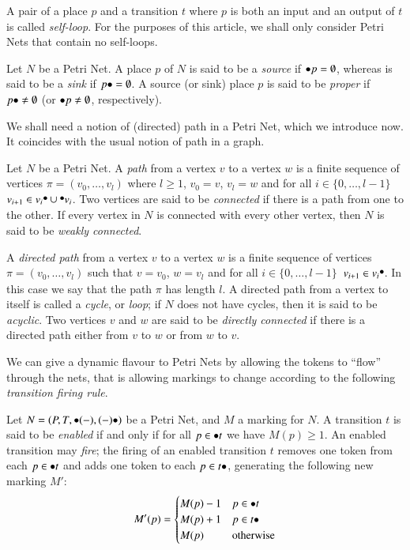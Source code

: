 A pair of a place $p$ and a transition $t$ where $p$ is both an input and an output of $t$ is called \emph{self-loop}. For the purposes of this article, we shall only consider Petri Nets that contain no self-loops.


\begin{definition}
	Let $N$ be a Petri Net. A place $p$ of $N$ is said to be a \emph{source} if $\inp p = \emptyset$, whereas is said to be a \emph{sink} if $\out p = \emptyset$. A source (or sink) place $p$ is said to be \emph{proper} if $\out p \ne \emptyset$ (or $\inp p \ne \emptyset$, respectively).
\end{definition}

We shall need a notion of (directed) path in a Petri Net, which we introduce now. It coincides with the usual notion of path in a graph.

\begin{definition}
	Let $N$ be a Petri Net. A \emph{path} from a vertex $v$ to a vertex $w$ is a finite sequence of vertices $\pi=(v_0,\dots,v_l)$ where $l \ge 1$, $v_0=v$, $v_l=w$ and for all $i \in \{0,\dots,l-1\}$ $v_{i+1} \in v_i \! \LargerCdot \! \cup \! \LargerCdot \! v_i $. Two vertices are said to be \emph{connected} if there is a path from one to the other. If every vertex in $N$ is connected with every other vertex, then $N$ is said to be \emph{weakly connected}.
	
	A \emph{directed path} from a vertex $v$ to a vertex $w$ is a finite sequence of vertices $\pi=(v_0,\dots,v_l)$ such that $v=v_0$, $w=v_l$ and for all $i \in \{0,\dots,l-1\}\,$ $v_{i+1} \in v_i \! \LargerCdot \!$. In this case we say that the path $\pi$ has length $l$. A directed path from a vertex to itself is called a \emph{cycle}, or \emph{loop}; if $N$ does not have cycles, then it is said to be \emph{acyclic}.
	Two vertices $v$ and $w$ are said to be \emph{directly connected} if there is a directed path either from $v$ to $w$ or from $w$ to $v$. 
\end{definition}


We can give a dynamic flavour to Petri Nets by allowing the tokens to “flow” through the nets, that is allowing markings to change according to the following \emph{transition firing rule}.

\begin{definition}
	Let $N=(P,T,\inp{(-)},\out{(-)})$ be a Petri Net, and $M$ a marking for $N$. A transition $t$ is said to be \emph{enabled} if and only if for all $p \in \inp t$ we have $M(p) \ge 1$. An enabled transition may \emph{fire}; the firing of an enabled transition $t$ removes one token from each $p \in \inp t$ and adds one token to each $p \in \out t$, generating the following new marking $M'$:
	\[
	M'(p) = \begin{cases}
	M(p) -1 & p \in \inp t \\
	M(p)+1  & p \in \out t \\
	M(p)    & \text{otherwise}
	\end{cases}
	\]
\end{definition}

